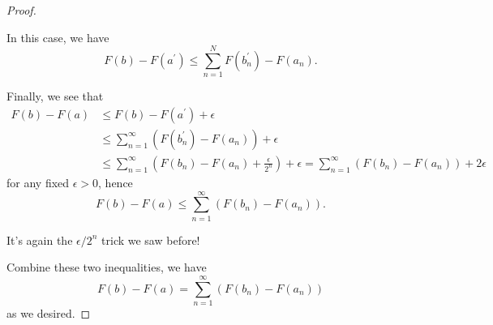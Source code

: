 \begin{proof}
\begin{explanation}
		In this case, we have
		\[
			F(b) - F(a ^\prime ) \leq \sum_{n=1}^{N} F(b_{n} ^\prime ) - F(a_{n}).
		\]


		Finally, we see that
		\[
			\begin{split}
				F(b) - F(a) & \leq F(b) - F(a ^\prime )+\epsilon                                                           \\
				            & \leq \sum_{n=1}^{\infty} \left(F(b_{n} ^\prime ) - F(a_{n})\right) + \epsilon                \\
				            & \leq \sum_{n=1}^{\infty} \left(F(b_{n}) - F(a_{n}) + \frac{\epsilon }{2^n}\right) + \epsilon
				= \sum_{n=1}^{\infty} \left(F(b_{n}) - F(a_{n})\right) + 2\epsilon
			\end{split}
		\]
		for any fixed \(\epsilon > 0\), hence
		\[
			F(b) - F(a) \leq \sum_{n=1}^{\infty} (F(b_{n}) - F(a_{n})).
		\]
		\begin{remark}
			It's again the \(\epsilon /2^n\) trick we saw before!
		\end{remark}
	\end{explanation}

	Combine these two inequalities, we have
	\[
		F(b) - F(a) = \sum_{n=1}^{\infty} (F(b_{n}) - F(a_{n}))
	\]
	as we desired.
\end{proof}